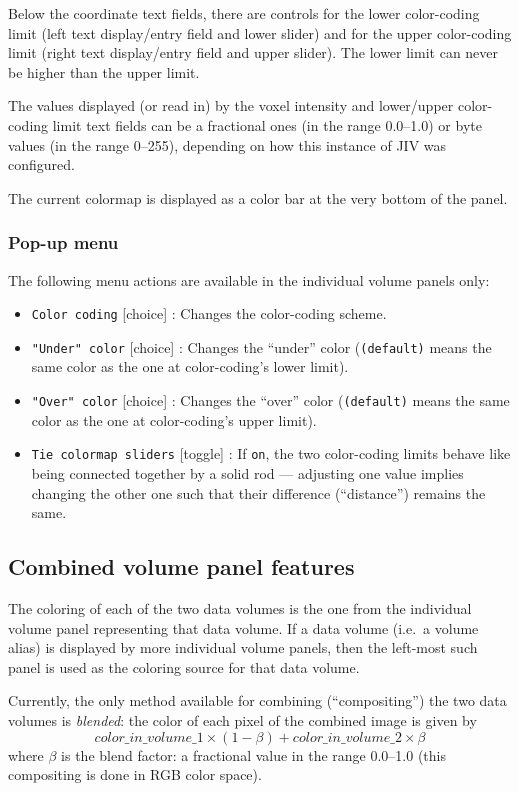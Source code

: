 Below the coordinate text fields, there are controls for the lower
color-coding limit (left text display/entry field and lower slider)
and for the upper color-coding limit (right text display/entry field
and upper slider).  The lower limit can never be higher than the upper
limit. 

The values displayed (or read in) by the voxel intensity and
lower/upper color-coding limit text fields can be a fractional ones
(in the range 0.0--1.0) or byte values (in the range 0--255),
depending on how this instance of JIV was configured.

The current colormap is displayed as a color bar at the very bottom of
the panel.

\subsubsection{Pop-up menu}
The following menu actions are available in the individual volume
panels only:
\begin{itemize}
\item \verb+Color coding+ [choice] : Changes the color-coding scheme.
\item \verb+"Under" color+ [choice] : Changes the ``under'' color
  (\verb+(default)+ means the same color as the one at color-coding's
  lower limit).
\item \verb+"Over" color+ [choice] : Changes the ``over'' color
  (\verb+(default)+ means the same color as the one at color-coding's
  upper limit).
\item \verb+Tie colormap sliders+ [toggle] : If \verb+on+, the two
  color-coding limits behave like being connected together by a solid
  rod --- adjusting one value implies changing the other one such that
  their difference (``distance'') remains the same.
\end{itemize}

\subsection{Combined volume panel features}
\label{sec:combined-panel-features}
The coloring of each of the two data volumes is the one from the
individual volume panel representing that data volume. If a data
volume (i.e.\ a volume alias) is displayed by more individual volume
panels, then the left-most such panel is used as the coloring source
for that data volume.

Currently, the only method available for combining (``compositing'')
the two data volumes is {\em blended}: the color of each pixel of
the combined image is given by
\[ color\_in\_volume\_1 \times ( 1 - \beta ) + 
color\_in\_volume\_2 \times \beta \] where $\beta$ is the blend
factor: a fractional value in the range 0.0--1.0 (this compositing is
done in RGB color space).

